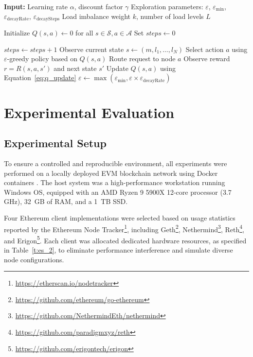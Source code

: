 \documentclass[lnbip]{svmultln}
\begin{document}
\begin{algorithm}
\footnotesize
\caption{Q-Learning for Load Balancing}
\label{algo:qlearning}
\begin{algorithmic}[1]
\Statex \textbf{Input:}
\Statex Learning rate $\alpha$, discount factor $\gamma$
\Statex Exploration parameters: $\varepsilon$, $\varepsilon_{\min}$, $\varepsilon_{\text{decayRate}}$, $\varepsilon_{\text{decaySteps}}$
\Statex Load imbalance weight $k$, number of load levels $L$

\State Initialize $Q(s, a) \gets 0$ for all $s \in \mathcal{S}, a \in \mathcal{A}$
\State Set $steps \gets 0$

    \State $steps \gets steps + 1$
    \State Observe current state $s \gets (m, l_1, \dots, l_N)$
    \State Select action $a$ using $\varepsilon$-greedy policy based on $Q(s, a)$
    \State Route request to node $a$
    \State Observe reward $r = R(s, a, s')$ and next state $s'$
    \State Update $Q(s, a)$ using Equation~\ref{eq:q_update}
        \State $\varepsilon \gets \max\left(\varepsilon_{\min}, \varepsilon \times \varepsilon_{\text{decayRate}}\right)$
    \EndIf
\EndFor
\end{algorithmic}
\end{algorithm}

\section{Experimental Evaluation}\label{s:5}

\subsection{Experimental Setup}\label{s:5.1}

To ensure a controlled and reproducible environment, all experiments were performed on a locally deployed EVM blockchain network using Docker containers \cite{merkel2014docker}. The host system was a high-performance workstation running Windows OS, equipped with an AMD Ryzen 9 5900X 12-core processor (3.7 GHz), 32~GB of RAM, and a 1~TB SSD.

Four Ethereum client implementations were selected based on usage statistics reported by the Ethereum Node Tracker\footnote{\url{https://etherscan.io/nodetracker}}, including Geth\footnote{\url{https://github.com/ethereum/go-ethereum}}, Nethermind\footnote{\url{https://github.com/NethermindEth/nethermind}}, Reth\footnote{\url{https://github.com/paradigmxyz/reth}}, and Erigon\footnote{\url{https://github.com/erigontech/erigon}}. Each client was allocated dedicated hardware resources, as specified in Table~\ref{t:es_2}, to eliminate performance interference and simulate diverse node configurations.
\end{document}
